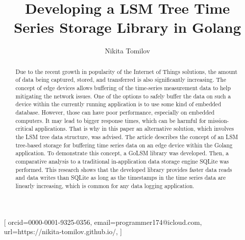 \documentclass[
]{ceurart}
\begin{document}
	


\title{Developing a LSM Tree Time Series Storage Library in Golang}


\author[1]{Nikita Tomilov}[%
orcid=0000-0001-9325-0356,
email=programmer174@icloud.com,
url=https://nikita-tomilov.github.io/,
]
\address[1]{ITMO University, Kronverksky Pr. 49, bldg. A, St. Petersburg, 197101, Russia}

%
%
\begin{abstract}
Due to the recent growth in popularity of the Internet of Things solutions, the amount of data being captured, stored, and transferred is also significantly increasing. The concept of edge devices allows buffering of the time-series measurement data to help mitigating the network issues. 
One of the options to safely buffer the data on such a device within the currently running application is to use some kind of embedded database. However, those can have poor performance, especially on embedded computers. It may lead to bigger response times, which can be harmful for mission-critical applications. That is why in this paper an alternative solution, which involves the LSM tree data structure, was advised.
The article describes the concept of an LSM tree-based storage for buffering time series data on an edge device within the Golang application. To demonstrate this concept, a GoLSM library was developed. Then, a comparative analysis to a traditional in-application data storage engine SQLite was performed. This research shows that the developed library provides faster data reads and data writes than SQLite as long as the timestamps in the time series data are linearly increasing, which is common for any data logging application.
\end{abstract}
\end{document}

